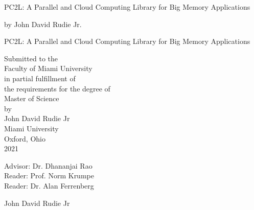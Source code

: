 \documentclass[12pt, oneside]{book2}
\begin{document}
\thispagestyle{empty}
\singlespacing

\begin{center}

\vspace{2.0cm}
PC2L: A Parallel and Cloud Computing Library for Big Memory Applications
\vspace{1.0cm}

by John David Rudie Jr.

\vspace{1.0cm}
\end{center}


\newpage

\thispagestyle{empty}

\frontmatter

\doublespacing

\begin{titlepage}
\begin{center}
PC2L: A Parallel and Cloud Computing Library for Big Memory Applications

\vspace{1.5cm}


\vspace{0.5cm}

Submitted to the \\
Faculty of Miami University \\
in partial fulfillment of \\
the requirements for the degree of \\
Master of Science \\
by \\
John David Rudie Jr \\
Miami University \\
Oxford, Ohio \\
2021

\vspace{1.5cm}

Advisor: Dr. Dhananjai Rao\\
Reader: Prof. Norm Krumpe\\
Reader: Dr. Alan Ferrenberg\\


\vspace{1.5cm}

 John David Rudie Jr

\end{center}

\end{titlepage}

\singlespacing
\setcounter{page}{3}
\tableofcontents
\setcounter{tocdepth}{2}
\cleardoublepage
{}
\listoftables
\cleardoublepage
{}
\listoffigures
\end{document}
